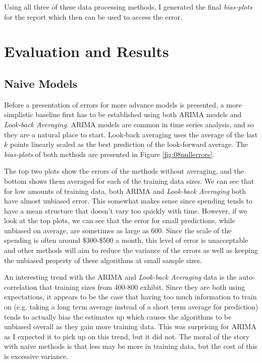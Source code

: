 \documentclass[11pt,a4paper]{article}
\newcommand{\bplots}{\textit{bias-plots}\xspace}
\begin{document}
Using all three of these data processing methods, I generated the final \bplots for the report which then can be used to access the error. 

\section{Evaluation and Results} \label{sec:results}

\newcommand{\lookback}{\textit{Look-back Averaging}\xspace}

\subsection{Naive Models}

Before a presentation of errors for more advance models is presented, a more simplistic baseline first has to be established using both ARIMA models and \lookback. ARIMA models are common in time series analysis, and so they are a natural place to start. Look-back averaging uses the average of the last $k$ points linearly scaled as the best prediction of the look-forward average. The \bplots of both methods are presented in Figure \ref{fig:08nullerrors}.

The top two plots show the errors of the methods without averaging, and the bottom shows them averaged for each of the training data sizes. We can see that for low amounts of training data, both ARIMA and \lookback both have almost unbiased error. This somewhat makes sense since spending tends to have a mean structure that doesn't vary too quickly with time. However, if we look at the top plots, we can see that the error for small predictions, while unbiased on average, are sometimes as large as 600. Since the scale of the spending is often around \$300-\$500 a month, this level of error is unacceptable and other methods will aim to reduce the variance of the errors as well as keeping the unbiased property of these algorithms at small sample sizes.

An interesting trend with the ARIMA and \lookback data is the auto-correlation that training sizes from 400-800 exhibit. Since they are both using expectations, it appears to be the case that having too much information to train on (e.g. taking a long term average instead of a short term average for prediction) tends to actually bias the estimates up which causes the algorithms to be unbiased overall as they gain more training data. This was surprising for ARIMA as I expected it to pick up on this trend, but it did not. The moral of the story with naive methods is that less may be more in training data, but the cost of this is excessive variance. 
\end{document}

